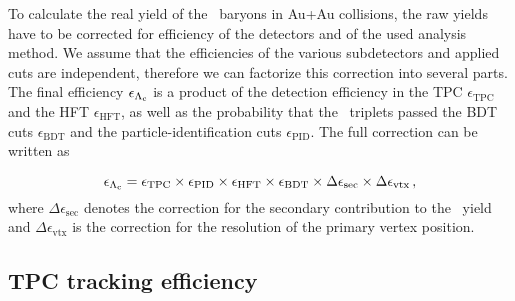 To calculate the real yield of the \Lambdac\ baryons in Au+Au collisions, the raw yields have to be corrected for efficiency of the detectors and of the used analysis method. We assume that the efficiencies of the various subdetectors and applied cuts are independent, therefore we can factorize this correction into several parts. The final efficiency $\epsilon_{{\Lambda_\text{c}}}$ is a product of the detection efficiency in the TPC $\epsilon_\mathrm{TPC}$ and the HFT $\epsilon_\mathrm{HFT}$, as well as the probability that the \Lambdac\ triplets passed the BDT cuts $\epsilon_\mathrm{BDT}$ and the particle-identification cuts $\epsilon_\mathrm{PID}$\@. The full correction can be written as

\begin{equation}
 \epsilon_{{\Lambda_\text{c}}} = \epsilon_\text{TPC} \times \epsilon_\text{PID} \times \epsilon_\text{HFT} \times \epsilon_\text{BDT} \times \Delta\epsilon_\text{sec} \times \Delta\epsilon_\text{vtx}\,,
\end{equation}
where $\Delta \epsilon_\mathrm{sec}$ denotes the correction for the secondary contribution to the \Lambdac\ yield and $\Delta\epsilon_\mathrm{vtx}$ is the correction for the resolution of the primary vertex position.

\subsection{TPC tracking efficiency}

